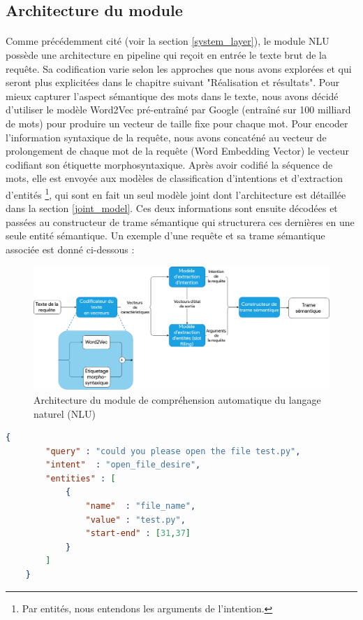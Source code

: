 	\subsection{Architecture du module}
	\paragraph{}
	\label{encoding}
	Comme précédemment cité (voir la section \ref{system_layer}), le module NLU possède une architecture en pipeline qui reçoit en entrée le texte brut de la requête. Sa codification varie selon les approches que nous avons explorées et qui seront plus explicitées dans le chapitre suivant "Réalisation et résultats". Pour mieux capturer l'aspect sémantique des mots dans le texte, nous avons décidé d'utiliser le modèle Word2Vec pré-entraîné par Google (entraîné sur 100 milliard de mots) pour produire un vecteur de taille fixe pour chaque mot. Pour encoder l'information syntaxique de la requête, nous avons concaténé au vecteur de prolongement de chaque mot de la requête (Word Embedding Vector) le vecteur codifiant son étiquette morphosyntaxique. Après avoir codifié la séquence de mots, elle est envoyée aux modèles de classification d'intentions et d'extraction d'entités \footnote{Par entités, nous entendons les arguments de l'intention.}, qui sont en fait un seul modèle joint dont l'architecture est détaillée dans la section \ref{joint_model}. Ces deux informations sont ensuite décodées et passées au constructeur de trame sémantique qui structurera ces dernières en une seule entité sémantique. Un exemple d'une requête et sa trame sémantique associée est donné ci-dessous :
	\begin{figure}[H] 
		\label{nlu_arch}
		\centering
		\includegraphics[width=0.88\linewidth]{images/Conception/NLU/nlu_module_arch.png}
		\caption{Architecture du module de compréhension automatique du langage naturel (NLU)}
	\end{figure}
	\begin{lstlisting}[language=json]
	{	
		"query"	: "could you please open the file test.py",
		"intent"  : "open_file_desire",
		"entities" : [
			{	
				"name"	: "file_name",
				"value"	: "test.py",
				"start-end"	: [31,37]
			}
		]
	}
	\end{lstlisting}
